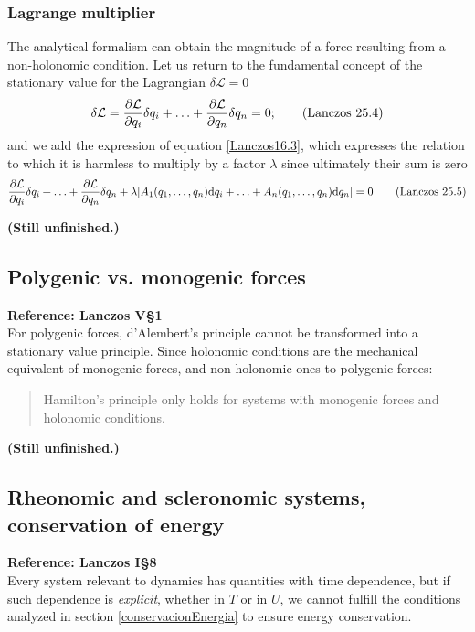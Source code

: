 \documentclass[12pt, english, a4paper]{article}
\begin{document}
\subsubsection{Lagrange multiplier}
The analytical formalism can obtain the magnitude of a force resulting from a non-holonomic condition.
Let us return to the fundamental concept of the stationary value for the Lagrangian \(\delta \mathcal{L} = 0\)
\begin{equation}\label{Lanczos25.4}
	\delta \mathcal{L} = \pdv{\mathcal{L}}{q_i} \delta q_i+ \ldots+ \pdv{\mathcal{L}}{q_n} \delta q_n= 0;
	\tag{Lanczos 25.4}
\end{equation}
and we add the expression of equation \eqref{Lanczos16.3}, which expresses the relation to which it is harmless to multiply by a factor \(\lambda\) since ultimately their sum is zero
\begin{equation}\label{Lanczos25.5}
	\pdv{\mathcal{L}}{q_i} \delta q_i+ \ldots+ \pdv{\mathcal{L}}{q_n} \delta q_n + \lambda \qty[ A_1(q_1,\ldots,q_n) \dd q_i+\ldots+ A_n(q_1,\ldots,q_n) \dd q_n ] = 0
	\tag{Lanczos 25.5}
\end{equation}

\textbf{(Still unfinished.)}


\subsection{Polygenic vs. monogenic forces}
\textbf{Reference: Lanczos V\S1}\\

For polygenic forces, d'Alembert's principle cannot be transformed into a stationary value principle.
Since holonomic conditions are the mechanical equivalent of monogenic forces, and non-holonomic ones to polygenic forces:
\begin{quote}
Hamilton's principle only holds for systems with monogenic forces and holonomic conditions.
\end{quote}

\textbf{(Still unfinished.)}


\subsection{Rheonomic and scleronomic systems, conservation of energy}
\textbf{Reference: Lanczos I\S8}\\

Every system relevant to dynamics has quantities with time dependence, but if such dependence is \emph{explicit}, whether in \(T\) or in \(U\), we cannot fulfill the conditions analyzed in section \ref{conservacionEnergia} to ensure energy conservation.
\end{document}
